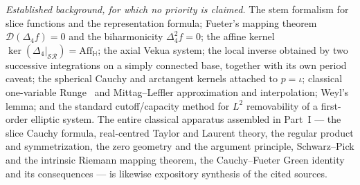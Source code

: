\documentclass[11pt,a4paper]{article}
\numberwithin{equation}{section}
\theoremstyle{definition}
\theoremstyle{remark}
\theoremstyle{plain}
\newcommand{\HH}{\mathbb H}
\newcommand{\Dop}{\mathcal D}
\newcommand{\lap}{\Delta_4}
\newcommand{\SR}{\mathcal{SR}}
\newcommand{\Aff}{\mathrm{Aff}_{\HH}}
\begin{document}
\emph{Established background, for which no priority is claimed.}
The stem formalism for slice functions and the representation formula;
Fueter's mapping theorem $\Dop(\lap f)=0$ and the biharmonicity
$\lap^2f=0$; the affine kernel $\ker(\lap|_{\SR})=\Aff$; the axial Vekua
system; the local inverse obtained by two successive integrations on a
simply connected base, together with its own period caveat; the spherical
Cauchy and arctangent kernels attached to $p=\iota$; classical one-variable
Runge~\cite{Runge} and Mittag--Leffler approximation and interpolation; Weyl's lemma;
and the standard cutoff/capacity method for $L^2$ removability of a
first-order elliptic system. The entire classical apparatus assembled in
Part~I --- the slice Cauchy formula, real-centred Taylor and Laurent
theory, the regular product and symmetrization, the zero geometry and the
argument principle, Schwarz--Pick and the intrinsic Riemann mapping
theorem, the Cauchy--Fueter Green identity and its consequences --- is
likewise expository synthesis of the cited sources.
\end{document}
